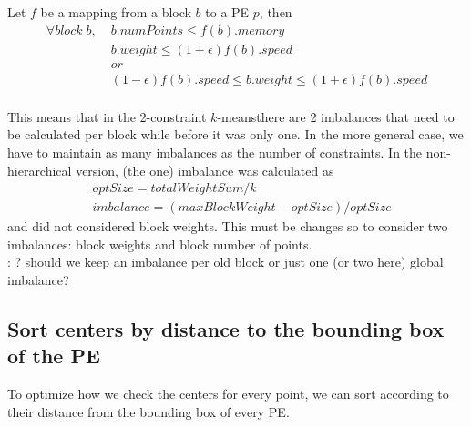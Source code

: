 \documentclass[a4paper,10pt]{article}
\newcommand{\red}[1]{{\color{red}{#1}}}
\newcommand{\km}{$k$-means}
\newcommand{\todo}[1]{{\red{TODO}}: #1}
\begin{document}
Let $f$ be a mapping from a block $b$ to a PE $p$, then
\begin{align*}
\forall block\;b,\; & b.numPoints \leq f(b).memory \\
& b.weight \leq (1+\epsilon)f(b).speed \\
& or\\
& (1-\epsilon)f(b).speed \leq b.weight \leq (1+\epsilon)f(b).speed \\
\end{align*}

This means that in the 2-constraint \km there are 2 imbalances that need to be calculated per block
while before it was only one. In the more general case, we have to maintain as many imbalances
as the number of constraints. In the non-hierarchical version, (the one) imbalance was
calculated as
\begin{align*}
& optSize = totalWeightSum/k \\
&imbalance = (maxBlockWeight-optSize)/optSize
\end{align*}
and did not considered block weights. This must be changes so to consider two imbalances:
block weights and block number of points.
\\\todo{? should we keep an imbalance per old block or just one (or two here) global imbalance?}


\subsection*{Sort centers by distance to the bounding box of the PE}

To optimize how we check the centers for every point, we can sort according to their distance
from the bounding box of every PE.
\end{document}
